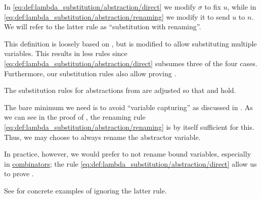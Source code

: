 \begin{comments}
  \item In \eqref{eq:def:lambda_substitution/abstraction/direct} we modify \( \sigma \) to fix \( u \), while in \eqref{eq:def:lambda_substitution/abstraction/renaming} we modify it to send \( u \) to \( n \). We will refer to the latter rule as \enquote{substitution with renaming}.
  \item This definition is loosely based on \cite[def. 1A7]{Hindley1997}, but is modified to allow substituting multiple variables. This results in less rules since \eqref{eq:def:lambda_substitution/abstraction/direct} subsumes three of the four cases. Furthermore, our substitution rules also allow proving .
\end{comments}

\begin{remark}\label{rem:renaming_substitution_rules}
  The substitution rules for abstractions from  are adjusted so that  and  hold.

  The bare minimum we need is to avoid \enquote{variable capturing} as discussed in . As we can see in the proof of , the renaming rule \eqref{eq:def:lambda_substitution/abstraction/renaming} is by itself sufficient for this. Thus, we may choose to always rename the abstractor variable.

  In practice, however, we would prefer to not rename bound variables, especially in \hyperref[def:lambda_combinator]{combinators}; the rule \eqref{eq:def:lambda_substitution/abstraction/direct} allow us to prove .

  See  for concrete examples of ignoring the latter rule.
\end{remark}


